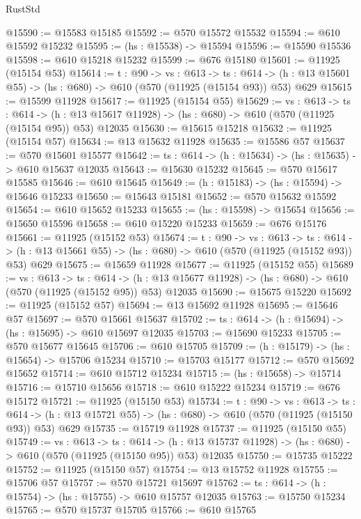 \begin{lexlean}{RustStd}
\begin{coremodule}
@15590 := @15583 @15185
@15592 := @570 @15572 @15532
@15594 := @610 @15592 @15232
@15595 := (hs : @15538) -> @15594
@15596 := @15590 @15536
@15598 := @610 @15218 @15232
@15599 := @676 @15180
@15601 := @11925 (@15154 @53)
@15614 := {t : @90} ->
  {vs : @613} ->
  {ts : @614} -> (h : @13 @15601 @55) -> (hs : @680) -> @610 (@570 (@11925 (@15154 @93)) @53) @629
@15615 := @15599 @11928
@15617 := @11925 (@15154 @55)
@15629 := {vs : @613} ->
  {ts : @614} ->
  (h : @13 @15617 @11928) -> (hs : @680) -> @610 (@570 (@11925 (@15154 @95)) @53) @12035
@15630 := @15615 @15218
@15632 := @11925 (@15154 @57)
@15634 := @13 @15632 @11928
@15635 := @15586 @57
@15637 := @570 @15601 @15577
@15642 := {ts : @614} -> (h : @15634) -> (hs : @15635) -> @610 @15637 @12035
@15643 := @15630 @15232
@15645 := @570 @15617 @15585
@15646 := @610 @15645
@15649 := (h : @15183) -> (hs : @15594) -> @15646 @15233
@15650 := @15643 @15181
@15652 := @570 @15632 @15592
@15654 := @610 @15652 @15233
@15655 := (hs : @15598) -> @15654
@15656 := @15650 @15596
@15658 := @610 @15220 @15233
@15659 := @676 @15176
@15661 := @11925 (@15152 @53)
@15674 := {t : @90} ->
  {vs : @613} ->
  {ts : @614} -> (h : @13 @15661 @55) -> (hs : @680) -> @610 (@570 (@11925 (@15152 @93)) @53) @629
@15675 := @15659 @11928
@15677 := @11925 (@15152 @55)
@15689 := {vs : @613} ->
  {ts : @614} ->
  (h : @13 @15677 @11928) -> (hs : @680) -> @610 (@570 (@11925 (@15152 @95)) @53) @12035
@15690 := @15675 @15220
@15692 := @11925 (@15152 @57)
@15694 := @13 @15692 @11928
@15695 := @15646 @57
@15697 := @570 @15661 @15637
@15702 := {ts : @614} -> (h : @15694) -> (hs : @15695) -> @610 @15697 @12035
@15703 := @15690 @15233
@15705 := @570 @15677 @15645
@15706 := @610 @15705
@15709 := (h : @15179) -> (hs : @15654) -> @15706 @15234
@15710 := @15703 @15177
@15712 := @570 @15692 @15652
@15714 := @610 @15712 @15234
@15715 := (hs : @15658) -> @15714
@15716 := @15710 @15656
@15718 := @610 @15222 @15234
@15719 := @676 @15172
@15721 := @11925 (@15150 @53)
@15734 := {t : @90} ->
  {vs : @613} ->
  {ts : @614} -> (h : @13 @15721 @55) -> (hs : @680) -> @610 (@570 (@11925 (@15150 @93)) @53) @629
@15735 := @15719 @11928
@15737 := @11925 (@15150 @55)
@15749 := {vs : @613} ->
  {ts : @614} ->
  (h : @13 @15737 @11928) -> (hs : @680) -> @610 (@570 (@11925 (@15150 @95)) @53) @12035
@15750 := @15735 @15222
@15752 := @11925 (@15150 @57)
@15754 := @13 @15752 @11928
@15755 := @15706 @57
@15757 := @570 @15721 @15697
@15762 := {ts : @614} -> (h : @15754) -> (hs : @15755) -> @610 @15757 @12035
@15763 := @15750 @15234
@15765 := @570 @15737 @15705
@15766 := @610 @15765

\end{coremodule}
\end{lexlean}
